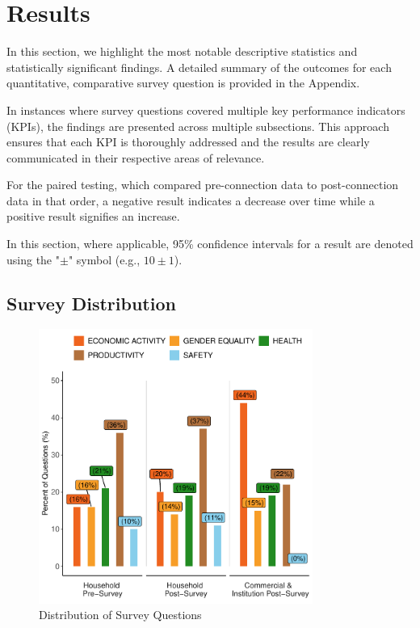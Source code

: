 \section{Results}
\label{sec:results}
In this section, we highlight the most notable descriptive statistics and statistically significant findings. A detailed summary of the outcomes for each quantitative, comparative survey question is provided in the Appendix.

In instances where survey questions covered multiple key performance indicators (KPIs), the findings are presented across multiple subsections. This approach ensures that each KPI is thoroughly addressed and the results are clearly communicated in their respective areas of relevance.

For the paired testing, which compared pre-connection data to post-connection data in that order, a negative result indicates a decrease over time while a positive result signifies an increase. 

In this section, where applicable, 95\% confidence intervals for a result are denoted using the "$\pm$" symbol (e.g., $10\pm1$).

\subsection{Survey Distribution}
\begin{figure}[th]
    \centering
    \includegraphics[width=0.8\textwidth]{images/questions_distribution_plot.pdf}
    \caption{Distribution of Survey Questions}
    \label{fig:distrbution_questions}
\end{figure}


